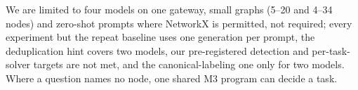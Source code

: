 \documentclass[11pt]{article}
\begin{document}
We are limited to four models on one gateway, small graphs (5--20 and 4--34 nodes)
and zero-shot prompts where NetworkX is permitted, not required; every experiment
but the repeat baseline uses one generation per prompt, the deduplication hint covers two models, our pre-registered detection and per-task-solver
targets are not met, and the canonical-labeling one only for two models. Where a
question names no node, one shared M3 program can decide a task.

\clearpage

\end{document}
